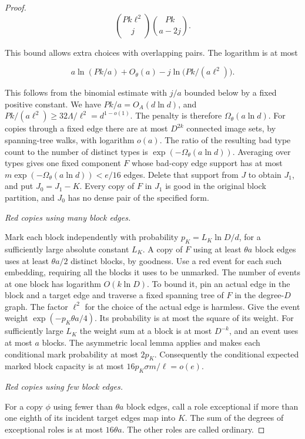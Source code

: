 \documentclass[11pt]{amsart}
\theoremstyle{definition}
\theoremstyle{remark}
\numberwithin{equation}{section}
\begin{document}
\begin{proof}
\begin{equation}
\binom{Pk\ell^2}{j}\binom{Pk}{a-2j}.
\end{equation}

This bound allows extra choices with overlapping pairs. The logarithm is at most

\begin{equation}
a\ln(Pk/a)+O_\theta(a)-j\ln\bigl(Pk/(a\ell^2)\bigr).
\end{equation}

This follows from the binomial estimate with $j/a $ bounded below by a fixed positive constant. We have $ Pk/a=O_A(d\ln d)$, and $ Pk/(a\ell^2)\ge32\Lambda/\ell^2=d^{1-o(1)}$. The penalty is therefore $\Omega_\theta(a\ln d)$. For copies through a fixed edge there are at most $ D^{2k}$ connected image sets, by spanning-tree walks, with logarithm $ o(a)$. The ratio of the resulting bad type count to the number of distinct types is $\exp(-\Omega_\theta(a\ln d))$. Averaging over types gives one fixed component $ F $ whose bad-copy edge support has at most $ m\exp(-\Omega_\theta(a\ln d))<e/16$ edges. Delete that support from $ J $ to obtain $ J_1$, and put $ J_0=J_1-K $. Every copy of $ F $ in $ J_1$ is good in the original block partition, and $ J_0$ has no dense pair of the specified form.

\medskip\noindent\emph{Red copies using many block edges.}

Mark each block independently with probability $p_K=L_K\ln D/d $, for a sufficiently large absolute constant $ L_K $. A copy of $ F $ using at least $\theta a $ block edges uses at least $\theta a/2$ distinct blocks, by goodness. Use a red event for each such embedding, requiring all the blocks it uses to be unmarked. The number of events at one block has logarithm $ O(k\ln D)$. To bound it, pin an actual edge in the block and a target edge and traverse a fixed spanning tree of $ F $ in the degree-$ D $ graph. The factor $\ell^2$ for the choice of the actual edge is harmless. Give the event weight $\exp(-p_K\theta a/4)$. Its probability is at most the square of its weight. For sufficiently large $ L_K $ the weight sum at a block is at most $ D^{-k}$, and an event uses at most $ a $ blocks. The asymmetric local lemma applies and makes each conditional mark probability at most $2p_K $. Consequently the conditional expected marked block capacity is at most $16p_K\sigma m/\ell=o(e)$.

\medskip\noindent\emph{Red copies using few block edges.}

For a copy $\phi $ using fewer than $\theta a $ block edges, call a role exceptional if more than one eighth of its incident target edges map into $ K $. The sum of the degrees of exceptional roles is at most $16\theta a$. The other roles are called ordinary.


\end{proof}
\end{document}
